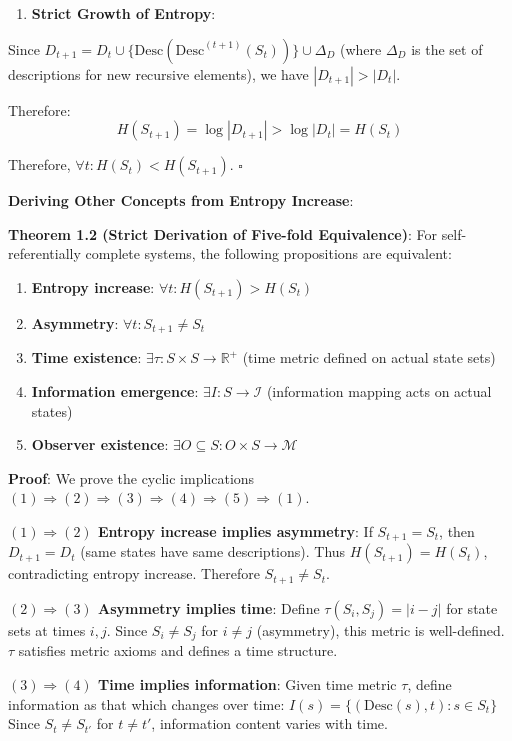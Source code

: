 \begin{enumerate}
\item \textbf{Strict Growth of Entropy}:
\end{enumerate}
  Since $D_{t+1} = D_t \cup \{\text{Desc}(\text{Desc}^{(t+1)}(S_t))\} \cup \Delta_D$
  (where $\Delta_D$ is the set of descriptions for new recursive elements),
  we have $|D_{t+1}| > |D_t|$.
  
  Therefore:
\begin{equation}
H(S_{t+1}) = \log |D_{t+1}| > \log |D_t| = H(S_t)
\end{equation}

Therefore, $\forall t: H(S_t) < H(S_{t+1})$. $\square$

\textbf{Deriving Other Concepts from Entropy Increase}:

\textbf{Theorem 1.2 (Strict Derivation of Five-fold Equivalence)}:
\label{thm:1.2}
For self-referentially complete systems, the following propositions are equivalent:

\begin{enumerate}
\item \textbf{Entropy increase}: $\forall t: H(S_{t+1}) > H(S_t)$
\item \textbf{Asymmetry}: $\forall t: S_{t+1} \neq S_t$
\item \textbf{Time existence}: $\exists \tau: S \times S \to \mathbb{R}^+$ (time metric defined on actual state sets)
\item \textbf{Information emergence}: $\exists I: S \to \mathcal{I}$ (information mapping acts on actual states)
\item \textbf{Observer existence}: $\exists O \subseteq S: O \times S \to \mathcal{M}$
\end{enumerate}

\textbf{Proof}: We prove the cyclic implications $(1) \Rightarrow (2) \Rightarrow (3) \Rightarrow (4) \Rightarrow (5) \Rightarrow (1)$.

\textbf{$(1) \Rightarrow (2)$ Entropy increase implies asymmetry}:
If $S_{t+1} = S_t$, then $D_{t+1} = D_t$ (same states have same descriptions).
Thus $H(S_{t+1}) = H(S_t)$, contradicting entropy increase.
Therefore $S_{t+1} \neq S_t$.

\textbf{$(2) \Rightarrow (3)$ Asymmetry implies time}:
Define $\tau(S_i, S_j) = |i - j|$ for state sets at times $i, j$.
Since $S_i \neq S_j$ for $i \neq j$ (asymmetry), this metric is well-defined.
$\tau$ satisfies metric axioms and defines a time structure.

\textbf{$(3) \Rightarrow (4)$ Time implies information}:
Given time metric $\tau$, define information as that which changes over time:
$I(s) = \{(\text{Desc}(s), t): s \in S_t\}$
Since $S_t \neq S_{t'}$ for $t \neq t'$, information content varies with time.

